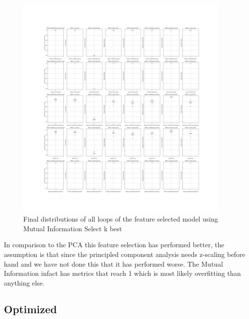 \documentclass[12pt, a4paper]{article}
\begin{document}
\begin{figure}[H]
    \begin{center}
        \includegraphics[width=0.95\textwidth]{figures/RNCV/BonusMI/All loop outer folds boxplots.png}
        \caption{Final distributions of all loops of the feature selected model using Mutual Information Select k best}\label{fig:bonusMI}
    \end{center}
\end{figure}

\begin{multicols}{2}

    In comparison to the PCA this feature selection has performed better, the assumption is that since the principled component analysis needs z-scaling before hand and we have not done this that it has performed worse. The Mutual Information infact has metrics that reach 1 which is most likely overfitting than anything else.
    \newline

    \subsection{Optimized} \label{subsec:opted model}

\end{multicols}
\end{document}

